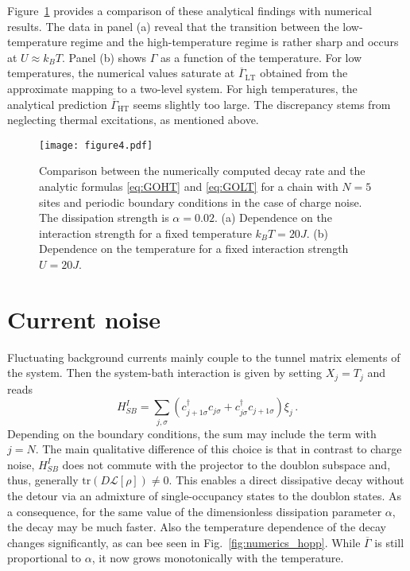 \documentclass[twocolumn,prb,showpacs]{revtex4-1}
\newcommand*{\tr}[1]{\mathrm{tr}\left(#1\right)}
\begin{document}
Figure~\ref{fig:analyticsOccup} provides a comparison of these analytical
findings with numerical results.  The data in panel (a) reveal that the
transition between the low-temperature regime and the high-temperature
regime is rather sharp and occurs at $U\approx k_BT$.  Panel (b) shows
$\Gamma$ as a function of the temperature.  For low temperatures, the
numerical values saturate at $\overline{\Gamma}_\text{LT}$ obtained from the
approximate mapping to a two-level system.  For high temperatures, the
analytical prediction $\overline{\Gamma}_\text{HT}$ seems slightly too 
large.  The discrepancy stems from neglecting thermal excitations, as 
mentioned above.

\begin{figure}[tb]
    \centering\texttt{[image: figure4.pdf]}
    \caption{Comparison between the numerically computed decay rate and the 
        analytic formulas \eqref{eq:GOHT} and \eqref{eq:GOLT} for a chain
        with $N=5$ sites and periodic boundary conditions in the case of 
        charge noise.  The dissipation strength is $\alpha=0.02$.
        (a) Dependence on the interaction strength for a fixed temperature $k_B 
        T=20J$. (b) Dependence on the temperature for a fixed interaction 
        strength $U=20J$.}
    \label{fig:analyticsOccup}
\end{figure}

\section{Current noise}
\label{sec:current}

Fluctuating background currents mainly couple to the tunnel matrix elements
of the system.  Then the system-bath interaction is given by setting 
$X_j=T_j$ and reads
\begin{equation}
H_{SB}^I = \sum_{j,\sigma} (c^\dagger_{j+1\sigma}c_{j\sigma} 
+ c^\dagger_{j\sigma} c_{j+1\sigma} ) \xi_j \,.
\end{equation}
Depending on the boundary conditions, the sum may include the term with
$j=N$.  The main qualitative difference of this choice is that in contrast
to charge noise, $H_{SB}^I$ does not commute with the projector to the
doublon subspace and, thus, generally ${\tr{D\mathcal{L}[\rho]}\neq 0}$.
This enables a direct dissipative decay without the detour via an admixture
of single-occupancy states to the doublon states.  As a consequence,
for the same value of the dimensionless dissipation parameter $\alpha$, the
decay may be much faster.  Also the temperature dependence of the decay
changes significantly, as can bee seen in Fig.~\ref{fig:numerics_hopp}.
While $\overline{\Gamma}$ is still proportional to $\alpha$, it now grows
monotonically with the temperature.
\end{document}
